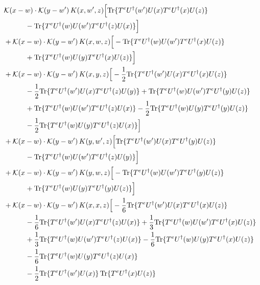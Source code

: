 \documentclass[10pt]{article}
\numberwithin{equation}{section}
\begin{document}
\begin{align}
&\mathcal K(x-w)\cdot\mathcal K(y-w')\,K(x,w',z)\Big[{\rm Tr}\{T^eU^\dagger(w')U(x)T^eU^\dagger(x)U(z)\}\notag\\
&\quad\quad\quad-{\rm Tr}\{T^eU^\dagger(w)U(w')T^eU^\dagger(z)U(x)\}\Big]\notag\\
&+\mathcal K(x-w)\cdot\mathcal K(y-w')\,K(x,w,z)\Big[-{\rm Tr}\{T^eU^\dagger(w)U(w')T^eU^\dagger(x)U(z)\}\notag\\
&\quad\quad\quad+{\rm Tr}\{T^eU^\dagger(w)U(y)T^eU^\dagger(x)U(z)\}\Big]\notag\\
&+\mathcal K(x-w)\cdot\mathcal K(y-w')\,K(x,y,z)\Big[-\frac{1}{2}{\rm Tr}\{T^eU^\dagger(w')U(x)T^eU^\dagger(x)U(z)\}\notag\\
&\quad\quad\quad-\frac{1}{2}{\rm Tr}\{T^eU^\dagger(w')U(x)T^eU^\dagger(z)U(y)\}+{\rm Tr}\{T^eU^\dagger(w)U(w')T^eU^\dagger(y)U(z)\}\notag\\
&\quad\quad\quad+{\rm Tr}\{T^eU^\dagger(w)U(w')T^eU^\dagger(z)U(x)\}-\frac{1}{2}{\rm Tr}\{T^eU^\dagger(w)U(y)T^eU^\dagger(y)U(z)\}\notag\\
&\quad\quad\quad-\frac{1}{2}{\rm Tr}\{T^eU^\dagger(w)U(y)T^eU^\dagger(z)U(x)\}\Big]\notag\\
&+\mathcal K(x-w)\cdot\mathcal K(y-w')\,K(y,w',z)\Big[{\rm Tr}\{T^eU^\dagger(w')U(x)T^eU^\dagger(y)U(z)\}\notag\\
&\quad\quad\quad-{\rm Tr}\{T^eU^\dagger(w)U(w')T^eU^\dagger(z)U(y)\}\Big]\notag\\
&+\mathcal K(x-w)\cdot\mathcal K(y-w')\,K(y,w,z)\Big[-{\rm Tr}\{T^eU^\dagger(w)U(w')T^eU^\dagger(y)U(z)\}\notag\\
&\quad\quad\quad+{\rm Tr}\{T^eU^\dagger(w)U(y)T^eU^\dagger(y)U(z)\}\Big]\notag\\
&+\mathcal K(x-w)\cdot\mathcal K(y-w')\,K(x,x,z)\Big[-\frac{1}{6}{\rm Tr}\{T^eU^\dagger(w')U(x)T^eU^\dagger(x)U(z)\}\notag\\
&\quad\quad\quad-\frac{1}{6}{\rm Tr}\{T^eU^\dagger(w')U(x)T^eU^\dagger(z)U(x)\}+\frac{1}{3}{\rm Tr}\{T^eU^\dagger(w)U(w')T^eU^\dagger(x)U(z)\}\notag\\
&\quad\quad\quad+\frac{1}{3}{\rm Tr}\{T^eU^\dagger(w)U(w')T^eU^\dagger(z)U(x)\}-\frac{1}{6}{\rm Tr}\{T^eU^\dagger(w)U(y)T^eU^\dagger(x)U(z)\}\notag\\
&\quad\quad\quad-\frac{1}{6}{\rm Tr}\{T^eU^\dagger(w)U(y)T^eU^\dagger(z)U(x)\}\notag\\
&\quad\quad\quad-\frac{1}{2}{\rm Tr}\{T^eU^\dagger(w')U(x)\}\,{\rm Tr}\{T^eU^\dagger(x)U(z)\}\notag\\

\end{align}
\end{document}
